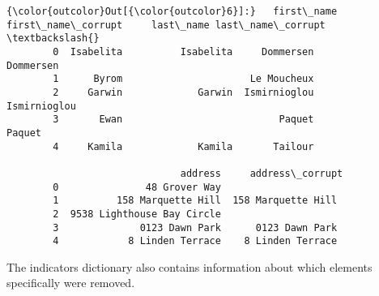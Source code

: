 \documentclass[11pt]{article}
\begin{document}
\begin{Verbatim}[commandchars=\\\{\}]
{\color{outcolor}Out[{\color{outcolor}6}]:}   first\_name first\_name\_corrupt     last\_name last\_name\_corrupt  \textbackslash{}
        0  Isabelita          Isabelita     Dommersen         Dommersen   
        1      Byrom                      Le Moucheux                     
        2     Garwin             Garwin  Ismirnioglou      Ismirnioglou   
        3       Ewan                           Paquet            Paquet   
        4     Kamila             Kamila       Tailour                     
        
                              address     address\_corrupt  
        0               48 Grover Way                      
        1          158 Marquette Hill  158 Marquette Hill  
        2  9538 Lighthouse Bay Circle                      
        3              0123 Dawn Park      0123 Dawn Park  
        4            8 Linden Terrace    8 Linden Terrace  
\end{Verbatim}
            
    The indicators dictionary also contains information about which elements
specifically were removed.
\end{document}
